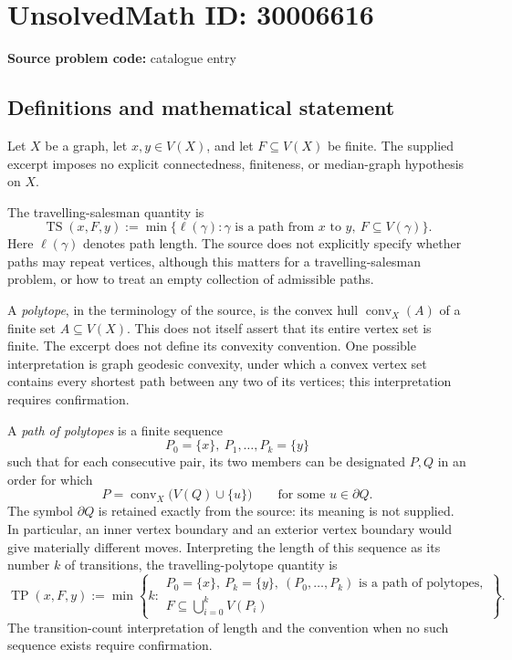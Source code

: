 \documentclass[11pt]{article}
\begin{document}
\section*{UnsolvedMath ID: 30006616}
\textbf{Source problem code:} catalogue entry
\subsection{Definitions and mathematical statement}
Let \(X\) be a graph, let \(x,y\in V(X)\), and let \(F\subseteq V(X)\) be finite. The supplied excerpt imposes no explicit connectedness, finiteness, or median-graph hypothesis on \(X\).

The travelling-salesman quantity is
\[
\operatorname{TS}(x,F,y)
:=\min\{\ell(\gamma):\gamma\text{ is a path from }x\text{ to }y,\ F\subseteq V(\gamma)\}.
\]
Here \(\ell(\gamma)\) denotes path length. The source does not explicitly specify whether paths may repeat vertices, although this matters for a travelling-salesman problem, or how to treat an empty collection of admissible paths.

A \emph{polytope}, in the terminology of the source, is the convex hull \(\operatorname{conv}_X(A)\) of a finite set \(A\subseteq V(X)\). This does not itself assert that its entire vertex set is finite. The excerpt does not define its convexity convention. One possible interpretation is graph geodesic convexity, under which a convex vertex set contains every shortest path between any two of its vertices; this interpretation requires confirmation.

A \emph{path of polytopes} is a finite sequence
\[
P_0=\{x\},\ P_1,\ldots,P_k=\{y\}
\]
such that for each consecutive pair, its two members can be designated \(P,Q\) in an order for which
\[
P=\operatorname{conv}_X\bigl(V(Q)\cup\{u\}\bigr)
\qquad\text{for some }u\in\partial Q.
\]
The symbol \(\partial Q\) is retained exactly from the source: its meaning is not supplied. In particular, an inner vertex boundary and an exterior vertex boundary would give materially different moves. Interpreting the length of this sequence as its number \(k\) of transitions, the travelling-polytope quantity is
\[
\operatorname{TP}(x,F,y)
:=\min\left\{k:\begin{array}{l}
P_0=\{x\},\ P_k=\{y\},\ (P_0,\ldots,P_k)\text{ is a path of polytopes},\\
F\subseteq\displaystyle\bigcup_{i=0}^{k}V(P_i)
\end{array}\right\}.
\]
The transition-count interpretation of length and the convention when no such sequence exists require confirmation.
\end{document}
